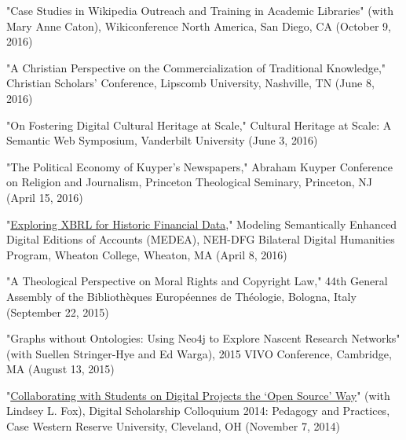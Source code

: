 \documentclass[]{res} %
\begin{document}
\begin{resume}
\begin{hangparas}{.25in}{1}"Case Studies in Wikipedia Outreach and Training in Academic Libraries" (with Mary Anne Caton), Wikiconference North America, San Diego, CA (October 9, 2016)\end{hangparas}

\begin{hangparas}{.25in}{1}"A Christian Perspective on the Commercialization of Traditional Knowledge," Christian Scholars’ Conference, Lipscomb University, Nashville, TN (June 8, 2016)\end{hangparas}

\begin{hangparas}{.25in}{1}"On Fostering Digital Cultural Heritage at Scale," Cultural Heritage at Scale: A Semantic Web Symposium, Vanderbilt University (June 3, 2016)\end{hangparas}

\begin{hangparas}{.25in}{1}"The Political Economy of Kuyper’s Newspapers," Abraham Kuyper Conference on Religion and Journalism, Princeton Theological Seminary, Princeton, NJ (April 15, 2016)\end{hangparas}

\begin{hangparas}{.25in}{1}"\href{http://medea.hypotheses.org/497}{Exploring XBRL for Historic Financial Data}," Modeling Semantically Enhanced Digital Editions of Accounts (MEDEA), NEH-DFG Bilateral Digital Humanities Program, Wheaton College, Wheaton, MA (April 8, 2016)\end{hangparas}

\begin{hangparas}{.25in}{1}"A Theological Perspective on Moral Rights and Copyright Law," 44th General Assembly of the Bibliothèques Européennes de Théologie, Bologna, Italy (September 22, 2015)\end{hangparas}

\begin{hangparas}{.25in}{1}"Graphs without Ontologies: Using Neo4j to Explore Nascent Research Networks" (with Suellen Stringer-Hye and Ed Warga), 2015 VIVO Conference, Cambridge, MA (August 13, 2015)\end{hangparas}

\begin{hangparas}{.25in}{1}"\href{https://www.youtube.com/watch?v=-Hbg6r3JZAQ}{Collaborating with Students on Digital Projects the ‘Open Source’ Way}" (with Lindsey L. Fox), Digital Scholarship Colloquium 2014: Pedagogy and Practices, Case Western Reserve University, Cleveland, OH (November 7, 2014)\end{hangparas}


\end{resume}
\end{document}
